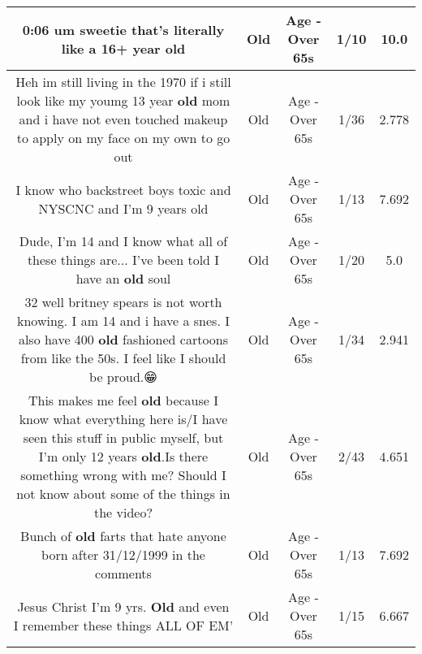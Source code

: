 \documentclass[11pt]{article}
\newlength\mylength
\begin{document}
\begin{center}
\begin{longtable}{|C{.65\mylength}|C{.30\mylength}|C{.12\mylength}|C{.12\mylength}|C{.12\mylength}|}
  \small 0:06 um sweetie that's literally like a 16+ year old\normalsize   & Old & Age - Over 65s & 1/10 & 10.0 \\  \hline
  \small Heh im still living in the 1970 if i still look like my youmg 13 year \textbf{old} mom and i have not even touched makeup to apply on my face on my own to go out\normalsize   & Old & Age - Over 65s & 1/36 & 2.778 \\  \hline
  \small I know who backstreet boys toxic and NYSCNC and I'm 9 years old\normalsize   & Old & Age - Over 65s & 1/13 & 7.692 \\  \hline
  \small Dude, I'm 14 and I know what all of these things are... I've been told I have an \textbf{old} soul\normalsize   & Old & Age - Over 65s & 1/20 & 5.0 \\  \hline
  \small 32 well britney spears is not worth knowing. I am 14 and i have a snes. I also have 400 \textbf{old} fashioned cartoons from like the 50s. I feel like I should be proud.😁\normalsize   & Old & Age - Over 65s & 1/34 & 2.941 \\  \hline
  \small This makes me feel \textbf{old} because I know what everything here is/I have seen this stuff in public myself, but I'm only 12 years \textbf{old}.Is there something wrong with me? Should I not know about some of the things in the video?\normalsize   & Old & Age - Over 65s & 2/43 & 4.651 \\  \hline
  \small Bunch of \textbf{old} farts that hate anyone born after 31/12/1999 in the comments\normalsize   & Old & Age - Over 65s & 1/13 & 7.692 \\  \hline
  \small Jesus Christ I'm 9 yrs. \textbf{Old} and even I remember these things ALL OF EM'\normalsize   & Old & Age - Over 65s & 1/15 & 6.667 \\  \hline

\end{longtable}
\end{center}
\end{document}
